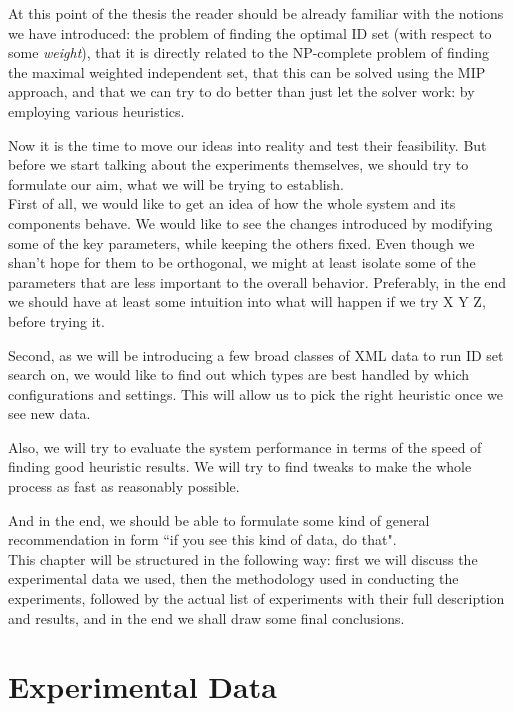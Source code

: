 \documentclass[a4paper,12pt,oneside]{report}
\theoremstyle{definition}
\begin{document}
At this point of the thesis the reader should be already familiar with the notions we have introduced: the problem of finding the optimal ID set (with respect to some \textit{weight}), that it is directly related to the NP-complete problem of finding the maximal weighted independent set, that this can be solved using the MIP approach, and that we can try to do better than just let the solver work: by employing various heuristics.

Now it is the time to move our ideas into reality and test their feasibility. But before we start talking about the experiments themselves, we should try to formulate our aim, what we will be trying to establish.\\

First of all, we would like to get an idea of how the whole system and its components behave. We would like to see the changes introduced by modifying some of the key parameters, while keeping the others fixed. Even though we shan't hope for them to be orthogonal, we might at least isolate some of the parameters that are less important to the overall behavior. Preferably, in the end we should have at least some intuition into what will happen if we try X Y Z, before trying it.

Second, as we will be introducing a few broad classes of XML data to run ID set search on, we would like to find out which types are best handled by which configurations and settings. This will allow us to pick the right heuristic once we see new data.

Also, we will try to evaluate the system performance in terms of the speed of finding good heuristic results. We will try to find tweaks to make the whole process as fast as reasonably possible.

And in the end, we should be able to formulate some kind of general recommendation in form ``if you see this kind of data, do that".\\

This chapter will be structured in the following way: first we will discuss the experimental data we used, then the methodology used in conducting the experiments, followed by the actual list of experiments with their full description and results, and in the end we shall draw some final conclusions.

\section{Experimental Data}
\end{document}
